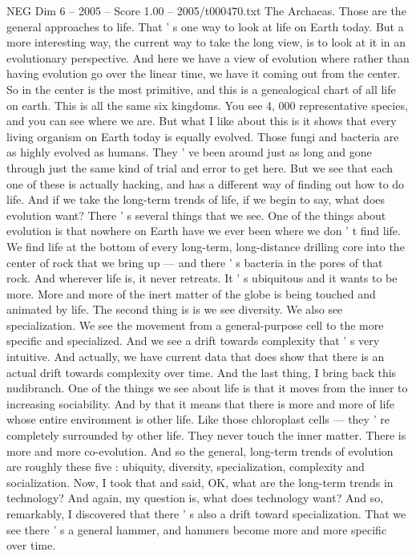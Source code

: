 \begin{textsample}{NEG Dim 6 – 2005 – Score 1.00 – 2005/t000470.txt}
The Archaeas.
Those are the general approaches to life.
That ' s one way to look at life on Earth today.
But a more interesting way, the current way to take the long view, is to look at it in an evolutionary perspective.
And here we have a view of evolution where rather than having evolution go over the linear time, we have it coming out from the center.
So in the center is the most primitive, and this is a genealogical chart of all life on earth.
This is all the same six kingdoms.
You see 4, 000 representative species, and you can see where we are.
But what I like about this is it shows that every living organism on Earth today is equally evolved.
Those fungi and bacteria are as highly evolved as humans.
They ' ve been around just as long and gone through just the same kind of trial and error to get here.
But we see that each one of these is actually hacking, and has a different way of finding out how to do life.
And if we take the long-term trends of life, if we begin to say, what does evolution want?
There ' s several things that we see.
One of the things about evolution is that nowhere on Earth have we ever been where we don ' t find life.
We find life at the bottom of every long-term, long-distance drilling core into the center of rock that we bring up — and there ' s bacteria in the pores of that rock.
And wherever life is, it never retreats.
It ' s ubiquitous and it wants to be more.
More and more of the inert matter of the globe is being touched and animated by life.
The second thing is is we see diversity.
We also see specialization.
We see the movement from a general-purpose cell to the more specific and specialized.
And we see a drift towards complexity that ' s very intuitive.
And actually, we have current data that does show that there is an actual drift towards complexity over time.
And the last thing, I bring back this nudibranch.
One of the things we see about life is that it moves from the inner to increasing sociability.
And by that it means that there is more and more of life whose entire environment is other life.
Like those chloroplast cells — they ' re completely surrounded by other life.
They never touch the inner matter.
There is more and more co-evolution.
And so the general, long-term trends of evolution are roughly these five : ubiquity, diversity, specialization, complexity and socialization.
Now, I took that and said, OK, what are the long-term trends in technology?
And again, my question is, what does technology want?
And so, remarkably, I discovered that there ' s also a drift toward specialization.
That we see there ' s a general hammer, and hammers become more and more specific over time.

\end{textsample}
